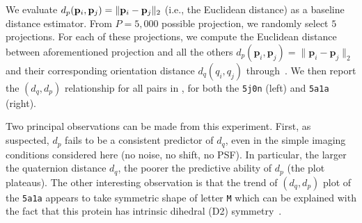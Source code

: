We evaluate $d_p(\mathbf{p}_i, \mathbf{p}_j) = \Vert \mathbf{p}_i - \mathbf{p}_j \Vert_2$ (i.e., the Euclidean distance) as a baseline distance estimator.
From $P = 5,000$ possible projection, we randomly select $5$ projections.
For each of these projections, we compute the Euclidean distance between aforementioned projection and all the others $d_p(\mathbf{p}_i,\mathbf{p}_j)=\lVert\mathbf{p}_i-\mathbf{p}_j\rVert_2$ and their corresponding orientation distance $d_q(q_i,q_j)$ through~.
We then report the $(d_q,d_p)$ relationship for all pairs in , for both the \texttt{5j0n} (left) and \texttt{5a1a} (right).

Two principal observations can be made from this experiment.
First, as suspected, $d_p$ fails to be a consistent predictor of $d_q$, even in the simple imaging conditions considered here (no noise, no shift, no PSF).
In particular, the larger the quaternion distance $d_q$, the poorer the predictive ability of $d_p$ (the plot plateaus).
The other interesting observation is that the trend of $(d_q,d_p)$ plot of the \texttt{5a1a} appears to take symmetric shape of letter \texttt{M} which can be explained with the fact that this protein has intrinsic dihedral (D2) symmetry~\cite{noauthor_d2sym_nodate,noauthor_5a1asym_nodate}.

